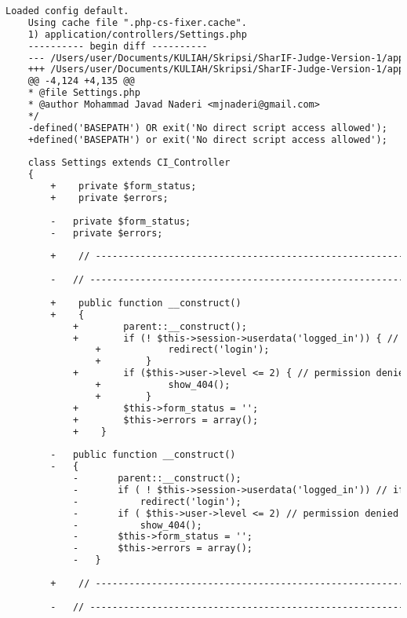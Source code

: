\begin{lstlisting}[language=diff, caption=Perubahan pada kode Settings.php]
	Loaded config default.
	Using cache file ".php-cs-fixer.cache".
	1) application/controllers/Settings.php
	---------- begin diff ----------
	--- /Users/user/Documents/KULIAH/Skripsi/SharIF-Judge-Version-1/application/controllers/Settings.php
	+++ /Users/user/Documents/KULIAH/Skripsi/SharIF-Judge-Version-1/application/controllers/Settings.php
	@@ -4,124 +4,135 @@
	* @file Settings.php
	* @author Mohammad Javad Naderi <mjnaderi@gmail.com>
	*/
	-defined('BASEPATH') OR exit('No direct script access allowed');
	+defined('BASEPATH') or exit('No direct script access allowed');
	
	class Settings extends CI_Controller
	{
		+    private $form_status;
		+    private $errors;
		
		-	private $form_status;
		-	private $errors;
		
		+    // ------------------------------------------------------------------------
		
		-	// ------------------------------------------------------------------------
		
		+    public function __construct()
		+    {
			+        parent::__construct();
			+        if (! $this->session->userdata('logged_in')) { // if not logged in
				+            redirect('login');
				+        }
			+        if ($this->user->level <= 2) { // permission denied
				+            show_404();
				+        }
			+        $this->form_status = '';
			+        $this->errors = array();
			+    }
		
		-	public function __construct()
		-	{
			-		parent::__construct();
			-		if ( ! $this->session->userdata('logged_in')) // if not logged in
			-			redirect('login');
			-		if ( $this->user->level <= 2) // permission denied
			-			show_404();
			-		$this->form_status = '';
			-		$this->errors = array();
			-	}
		
		+    // ------------------------------------------------------------------------
		
		-	// ------------------------------------------------------------------------
		

\end{lstlisting}
